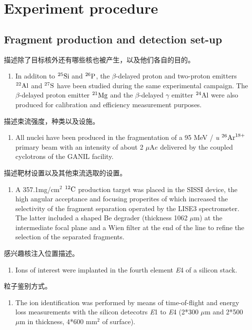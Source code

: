 \documentclass[UTF8]{ctexart}
\begin{document}
\section{Experiment procedure}
\subsection{Fragment production and detection set-up}

描述除了目标核外还有哪些核也被产生，以及他们各自的目的。
\begin{enumerate}
    \item In additon to $^{25}\textnormal{Si}$ and $^{26}\textnormal{P}$, the $\beta$-delayed proton and two-proton emitters $^{22}\textnormal{Al}$ and $^{27}\textnormal{S}$ have been studied during the same experimental campaign. The $\beta$-delayed proton emitter $^{21}\textnormal{Mg}$ and the $\beta$-delayed $\gamma$ emitter $^{24}\textnormal{Al}$ were also produced for calibration and efficiency measurement purposes.
\end{enumerate}

描述束流强度，种类以及设施。
\begin{enumerate}
    \item All nuclei have been produced in the fragmentation of a 95 MeV / \textit{u} $^{26}\textnormal{Ar}^{18+}$ primary beam with an intensity of about 2 $\mu$A$e$ delivered by the coupled cyclotrons of the GANIL facility.
\end{enumerate}

描述靶材设置以及其他束流选取的设置。
\begin{enumerate}
    \item A 357.1mg/cm$^{2}$ $^{12}\textnormal{C}$ production target was placed in the SISSI device, the high angular acceptance and focusing properites of which increased the selectivity of the fragment separation operated by the LISE3 spectrometer. The latter included a shaped Be degrader (thickness 1062 $\mu$m) at the intermediate focal plane and a Wien filter at the end of the line to refine the selection of the separated fragments.
\end{enumerate}

感兴趣核注入位置描述。
\begin{enumerate}
    \item Ions of interest were implanted in the fourth element \textit{E}4 of a silicon stack.
\end{enumerate}

粒子鉴别方式。
\begin{enumerate}
    \item The ion identification was performed by means of time-of-flight and energy loss measurements with the silicon detecotrs \textit{E}1 to \textit{E}4 (2*300 $\mu$m and 2*500 $\mu$m in thickness, 4*600 mm$^{2}$ of surface).
\end{enumerate}
\end{document}
